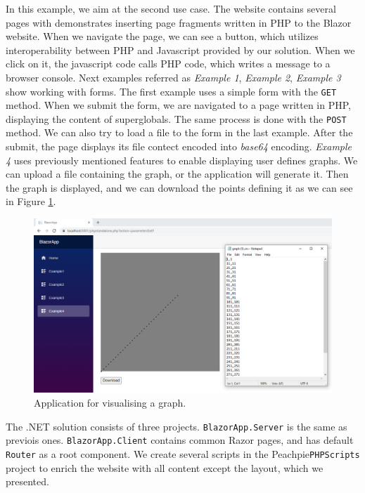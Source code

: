 In this example, we aim at the second use case.
The website contains several pages with demonstrates inserting page fragments written in PHP to the Blazor website.
When we navigate the page, we can see a button, which utilizes interoperability between PHP and Javascript provided by our solution.
When we click on it, the javascript code calls PHP code, which writes a message to a browser console.
Next examples referred as \textit{Example 1}, \textit{Example 2}, \textit{Example 3} show working with forms.
The first example uses a simple form with the \texttt{GET} method.
When we submit the form, we are navigated to a page written in PHP, displaying the content of superglobals.
The same process is done with the \texttt{POST} method.
We can also try to load a file to the form in the last example.
After the submit, the page displays its file contect encoded into \textit{base64} encoding.
\textit{Example 4} uses previously mentioned features to enable displaying user defines graphs.
We can upload a file containing the graph, or the application will generate it.
Then the graph is displayed, and we can download the points defining it as we can see in Figure \ref{img27:graph}.
\par
\begin{figure}\centering
\includegraphics[scale=0.4]{./img/graph}
\caption{Application for visualising a graph.}
\label{img27:graph}
\end{figure} 
\par
The .NET solution consists of three projects.
\texttt{BlazorApp.Server} is the same as previois ones.
\texttt{BlazorApp.Client} contains common Razor pages, and has default \texttt{Router} as a root component.
We create several scripts in the Peachpie\texttt{PHPScripts} project to enrich the website with all content except the layout, which we presented.
